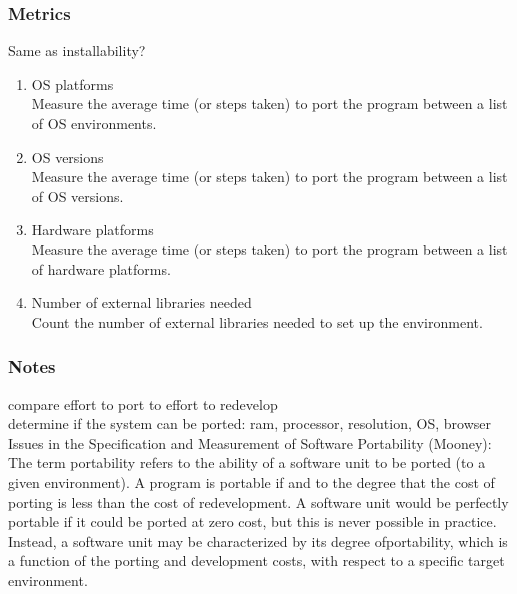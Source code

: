 \documentclass{article}
\begin{document}
\subsubsection{Metrics}
Same as installability?
\begin{enumerate}
	\item OS platforms\\
	
	Measure the average time (or steps taken) to port the program between a list of OS environments.
	\item OS versions\\
	
	Measure the average time (or steps taken) to port the program between a list of OS versions.
	\item Hardware platforms\\
	
	Measure the average time (or steps taken) to port the program between a list of hardware platforms.
	
	\item Number of external libraries needed\\
	
	Count the number of external libraries needed to set up the environment.
	
\end{enumerate}

\subsubsection{Notes}
compare effort to port to effort to redevelop\\ 

determine if the system can be ported: ram, processor, resolution, OS, browser\\ 

\noindent Issues in the Specification and Measurement of Software Portability (Mooney):\\
The term portability
 refers to the ability of a software
 unit to be ported (to a given environment).
 A program is
 portable if and to the degree that the cost of porting is less than
 the cost of redevelopment. A software unit would be perfectly
 portable if it could be ported at zero cost, but this is never
 possible in practice.
 Instead, a software unit may be
 characterized by its degree ofportability,
 which is a function of
 the porting and development costs, with respect to a specific
 target environment.\\   
 
\end{document}
